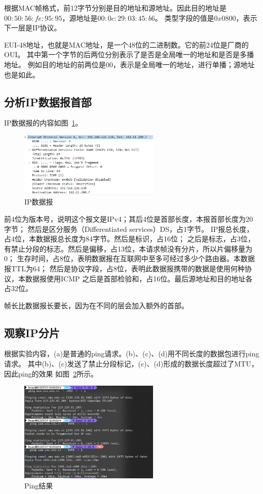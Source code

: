 \documentclass[a4paper,twoside]{article}
\begin{document}
\begin{spacing}{1.2}
根据MAC帧格式，前12字节分别是目的地址和源地址。因此目的地址是
$00:50:56:fe:95:95$，源地址是$00:0c:29:03:45:b6$。
类型字段的值是$0x0800$，表示下一层是IP协议。

EUI-48地址，也就是MAC地址，是一个48位的二进制数。它的前24位是厂商的OUI。
其中第一个字节的后两位分别表示了是否是全局唯一的地址和是否是多播地址。
例如目的地址的前两位是$00$，表示是全局唯一的地址，进行单播；源地址也是如此。


\subsection{分析IP数据报首部}

IP数据报的内容如图~\ref{fig:ip}。

\begin{figure}[htb]
	\centering
	\caption{IP数据报}
	\label{fig:ip}
	\includegraphics[width=0.6\textwidth]{ip.png}
\end{figure}

前4位为版本号，说明这个报文是IPv4；其后4位是首部长度，本报首部长度为20字节；
然后是区分服务（Differentiated services）DS，占1字节。
IP报总长度，占4位，本数据报总长度为84字节。然后是标识，占16位；
之后是标志，占3位，有禁止分段的标志。然后是偏移，占13位，本请求帧没有分片，所以片偏移量为0；
生存时间，占8位，表明数据报在互联网中至多可经过多少个路由器。本数据报TTL为64；
然后是协议字段，占8位，表明此数据报携带的数据是使用何种协议，本数据报使用ICMP
之后是首部检验和，占16位。最后源地址和目的地址各占32位。

帧长比数据报长要长，因为在不同的层会加入额外的首部。

\subsection{观察IP分片}

根据实验内容，(a)是普通的ping请求。(b)、(c)、(d)用不同长度的数据包进行ping请求。
其中(b)、(c)发送了禁止分段标记，(c)、(d)形成的数据长度超过了MTU，因此ping的效果
如图~\ref{fig:ip_frag}所示。


\begin{figure}[htb]
	\centering
	\caption{Ping结果}
	\label{fig:ip_frag}
	\includegraphics[width=0.6\textwidth]{ip_frag.png}
\end{figure}


\end{spacing}
\end{document}
